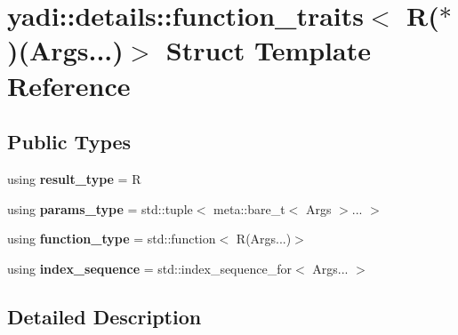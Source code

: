 \hypertarget{structyadi_1_1details_1_1function__traits_3_01_r_07_5_08_07_args_8_8_8_08_4}{}\section{yadi\+:\+:details\+:\+:function\+\_\+traits$<$ R($\ast$)(Args...)$>$ Struct Template Reference}
\label{structyadi_1_1details_1_1function__traits_3_01_r_07_5_08_07_args_8_8_8_08_4}
\subsection*{Public Types}
\begin{DoxyCompactItemize}
\item 
\mbox{\label{structyadi_1_1details_1_1function__traits_3_01_r_07_5_08_07_args_8_8_8_08_4_aaa153c66f8001956278b60d9596283ff}} 
using {\bfseries result\+\_\+type} = R
\item 
\mbox{\label{structyadi_1_1details_1_1function__traits_3_01_r_07_5_08_07_args_8_8_8_08_4_a4a8d56109e247e39be130228d361d626}} 
using {\bfseries params\+\_\+type} = std\+::tuple$<$ meta\+::bare\+\_\+t$<$ Args $>$... $>$
\item 
\mbox{\label{structyadi_1_1details_1_1function__traits_3_01_r_07_5_08_07_args_8_8_8_08_4_a2b9f01eb0463dada8e25dd6d6e5abbe1}} 
using {\bfseries function\+\_\+type} = std\+::function$<$ R(Args...)$>$
\item 
\mbox{\label{structyadi_1_1details_1_1function__traits_3_01_r_07_5_08_07_args_8_8_8_08_4_a8443ef70c4af55cf7eb50b8698fbd3d3}} 
using {\bfseries index\+\_\+sequence} = std\+::index\+\_\+sequence\+\_\+for$<$ Args... $>$
\end{DoxyCompactItemize}


\subsection{Detailed Description}
